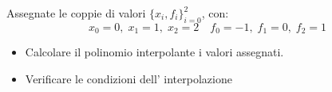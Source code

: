 Assegnate le coppie di valori $\{x_i,f_i \}_{i=0}^2$, con:
\[ x_0=0, \; x_1=1, \; x_2=2 \quad f_0=-1, \; f_1=0, \; f_2=1 \]
\begin{itemize}
\item Calcolare il polinomio interpolante i
valori assegnati.
\item Verificare le condizioni dell' interpolazione
\end{itemize}
